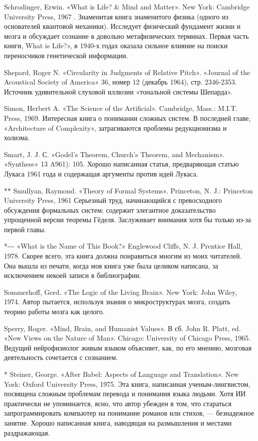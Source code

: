 Schrodinger, Erwin. «What is Life? \& Mind and Matter». New York: Cambridge University Press, 1967 . Знаменитая книга знаменитого физика (одного из основателей квантовой механики). Исследует физический фундамент жизни и мозга и обсуждает сознание в довольно метафизических терминах. Первая часть книги, What is Life?», в 1940-х годах оказала сильное влияние на поиски переносчиков генетической информации.

Shepard, Roger N. «Circularity in Judgments of Relative Pitch». «Journal of the Acoustical Society of America» 36, номер 12 (декабрь 1964), стр. 2346-2353. Источник удивительной слуховой иллюзии «тональной системы Шепарда».

Simon, Herbert A. «The Science of the Artificial». Cambridge, Mass.: M.I.T. Press, 1969. Интересная книга о понимании сложных систем. В последней главе, «Architecture of Complexity», затрагиваются проблемы редукционизма и холизма.

Smart, J. J. С. «Godel's Theorem, Church's Theorem, and Mechanism». «Synthese» 13 A961): 105. Хорошо написанная статья, предваряющая статью Лукаса 1961 года и содержащая аргументы против идей Лукаса.

** Smullyan, Raymond. «Theory of Formal Systems». Princeton, N. J.: Princeton University Press, 1961 Серьезный труд, начинающийся с превосходного обсуждения формальных систем; содержит элегантное доказательство упрощенной версии теоремы Гёделя. Заслуживает внимания хотя бы только из-за первой главы.

*-\/-\/- «What is the Name of This Book?» Englewood Cliffs, N. J. Prentice Hall, 1978. Скорее всего, эта книга должна понравиться многим из моих читателей. Она вышла из печати, когда моя книга уже была целиком написана, за исключением некоей записи в библиографии.

Sommerhoff, Gerd. «The Logic of the Living Brain». New York: John Wiley, 1974. Автор пытается, используя знания о микроструктурах мозга, создать теорию работы мозга как целого.

Sperry, Roger. «Mind, Brain, and Humanist Values». В сб. John R. Platt, ed. «New Views on the Nature of Man». Chicago: University of Chicago Press, 1965. Ведущий нейрофизиолог живым языком объясняет, как, по его мнению, мозговая деятельность сочетается с сознанием.

* Steiner, George. «After Babel: Aspects of Language and Translation». New York: Oxford University Press, 1975. Эта книга, написанная ученым-лингвистом, посвящена сложным проблемам перевода и понимания языка людьми. Хотя ИИ практически не упоминается, ясно, что автор убежден в том, что стараться запрограммировать компьютер на понимание романов или стихов, --- безнадежное занятие. Хорошо написанная книга, наводящая на размышления и местами раздражающая.

